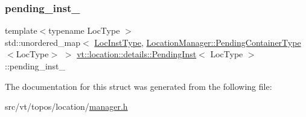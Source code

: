 \subsubsection{\texorpdfstring{pending\+\_\+inst\+\_\+}{pending\_inst\_}}
{\footnotesize\ttfamily template$<$typename Loc\+Type $>$ \\
std\+::unordered\+\_\+map$<$ \hyperlink{namespacevt_1_1location_a4db6456e8024af2d23fc5ae560fef866}{Loc\+Inst\+Type}, \hyperlink{structvt_1_1location_1_1_location_manager_aad005a828c535232cd6b63859b25b171}{Location\+Manager\+::\+Pending\+Container\+Type}$<$Loc\+Type$>$ $>$ \hyperlink{structvt_1_1location_1_1details_1_1_pending_inst}{vt\+::location\+::details\+::\+Pending\+Inst}$<$ Loc\+Type $>$\+::pending\+\_\+inst\+\_\+\hspace{0.3cm}{\ttfamily [static]}}



The documentation for this struct was generated from the following file\+:\begin{DoxyCompactItemize}
\item 
src/vt/topos/location/\hyperlink{topos_2location_2manager_8h}{manager.\+h}\end{DoxyCompactItemize}
